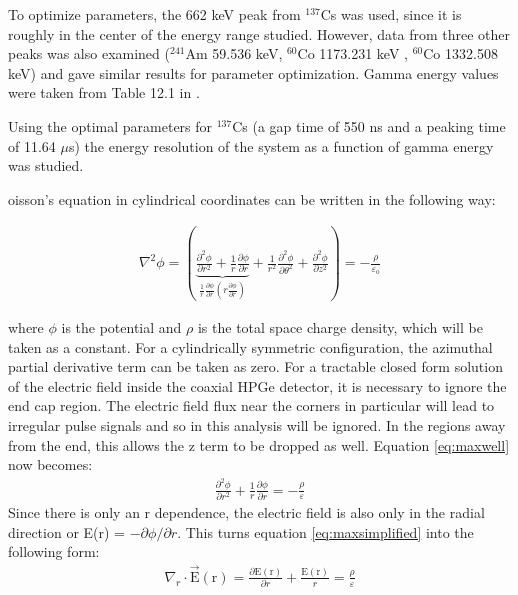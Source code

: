 To optimize parameters, the 662 keV peak from $^{137}$Cs was used, since it is roughly in the center of the energy range studied. However, data from three other peaks was also examined (${}^{241}$Am 59.536 keV, ${}^{60}$Co 1173.231 keV , ${}^{60}$Co 1332.508 keV) and gave similar results for parameter optimization. Gamma energy values were taken from Table 12.1 in \cite{Knoll} .

Using the optimal parameters for $^{137}$Cs (a gap time of 550 ns and a peaking time of 11.64 $\mu$s) the energy resolution of the system as a function of gamma energy was studied.

oisson's equation in cylindrical coordinates can be written in the following way:

\begin{align}\label{eq:maxwell}
\nabla ^2\phi = \left( {\underbrace {\frac{\partial ^2\phi
}{\partial r^2} + \frac{1}{r}\frac{\partial \phi }{\partial
r}}_{\frac{1}{r}\frac{\partial \phi }{\partial r}\left(
{r\frac{\partial \phi }{\partial r}} \right)} +
\frac{1}{r^2}\frac{\partial ^2\phi }{\partial \theta ^2} +
\frac{\partial ^2\phi }{\partial z^2}} \right) = -\frac{\rho}{\varepsilon_\mathrm{o}}
\end{align}

\noindent where $\phi$ is the potential and $\rho$ is the total space charge density, which will be taken as a constant. For a cylindrically symmetric configuration, the azimuthal partial derivative term can be taken as zero. For a tractable closed form solution of the electric field inside the coaxial HPGe detector, it is necessary to ignore the end cap region. The electric field flux near the corners in particular will lead to irregular pulse signals and so in this analysis will be ignored. In the regions away from the end, this allows the z term to be dropped as well. Equation \ref{eq:maxwell} now becomes:
\begin{align}\label{eq:maxsimplified}
\frac{\partial ^2\phi
}{\partial r^2} + \frac{1}{r}\frac{\partial \phi }{\partial
r} = -\frac{\rho}{\varepsilon}
\end{align}
\indent Since there is only an r dependence, the electric field is also only in the radial direction or E(r) = $-\partial\phi/\partial r$. This turns equation \ref{eq:maxsimplified} into the following form:
\begin{align}
\nabla_{r} \cdot \vec{\mathrm{E}}\mathrm{(r)} = \frac{\partial \mathrm{E(r)}
}{\partial r} + \frac{\mathrm{E(r)}}{r} = \frac{\rho}{\varepsilon}
\end{align}

